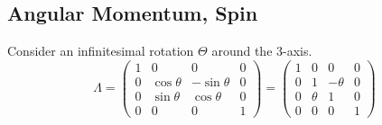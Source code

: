 \documentclass[]{scrartcl}
\begin{document}
\subsection{Angular Momentum, Spin}
Consider an infinitesimal rotation $\Theta$ around the 3-axis.
$$
\Lambda = 
\begin{pmatrix}
	1 & 0 & 0 & 0\\
	0 & \cos\theta & -\sin\theta & 0\\
	0 & \sin\theta & \cos\theta & 0\\
	0 & 0 & 0 & 1
\end{pmatrix} =
\begin{pmatrix}
	1 & 0 & 0 & 0\\
	0 & 1 & -\theta & 0\\
	0 & \theta & 1 & 0\\
	0 & 0 & 0 & 1
\end{pmatrix}
$$
\end{document}
